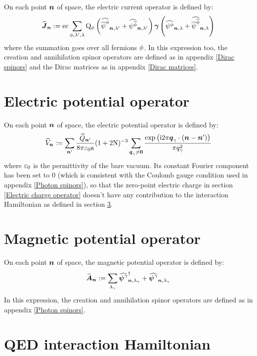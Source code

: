 On each point $\boldsymbol{n}$ of space, the electric current operator is defined by:
\begin{equation*}
\widehat{\boldsymbol{J}}_{\boldsymbol{n}} := \mathrm e \mathrm c \sum_{\phi,\lambda',\lambda} \mathrm Q_{\phi} \left( \widehat{\overline \psi^{\phi}}_{{\boldsymbol{n}}, {\lambda'}} + \widehat{\psi^{\overline{\phi}}}_{{\boldsymbol{n}}, {\lambda'}} \right) \boldsymbol{\gamma} \left( \widehat{\psi^{\phi}}_{{\boldsymbol{n}}, {\lambda}} + \widehat{\overline \psi^{\overline{\phi}}}_{{\boldsymbol{n}}, {\lambda}} \right)
\end{equation*}
where the summation goes over all fermions $\phi$. In this expression too, the creation and annihilation spinor operators are defined as in appendix \ref{Dirac spinors} and the Dirac matrices as in appendix \ref{Dirac matrices}.

\section{Electric potential operator}

On each point $\boldsymbol{n}$ of space, the electric potential operator is defined by:
\begin{equation*}
\widehat{V}_{\boldsymbol{n}} := \sum_{\boldsymbol{n}'} \frac{\widehat{Q}_{\boldsymbol{n}'}}{8 \pi \mathrm \varepsilon_0 \mathrm a} ( 1 + 2 \mathrm N )^{-3} \sum_{\boldsymbol{q}_\gamma \neq \boldsymbol{0}} \frac{\mathrm{exp} \left( {\mathrm{i} 2 \pi \boldsymbol{q}_\gamma \cdot ( \boldsymbol{n} - \boldsymbol{n}' )} \right)}{\pi q_\gamma^2}
\end{equation*}
where $\mathrm \varepsilon_0$ is the permittivity of the bare vacuum. Its constant Fourier component has been set to $0$ (which is consistent with the Coulomb gauge condition used in appendix \ref{Photon spinors}), so that the zero-point electric charge in section \ref{Electric charge operator} doesn't have any contribution to the interaction Hamiltonian as defined in section \ref{QED interaction Hamiltonian}.

\section{Magnetic potential operator}

On each point $\boldsymbol{n}$ of space, the magnetic potential operator is defined by:
\begin{equation*}
\widehat{\boldsymbol{A}}_{\boldsymbol{n}} := \sum_{\lambda_\gamma} \widehat{\boldsymbol{\psi}^{\gamma}}^{\dagger}_{{\boldsymbol{n}}, {\lambda_\gamma}} + \widehat{\boldsymbol{\psi}^{\gamma}}_{{\boldsymbol{n}}, {\lambda_\gamma}}
\end{equation*}
In this expression, the creation and annihilation spinor operators are defined as in appendix \ref{Photon spinors}.

\section{QED interaction Hamiltonian}
\label{QED interaction Hamiltonian}

